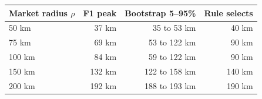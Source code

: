 \begin{tabular}{lrrr}
\toprule
Market radius $\rho$ & F1 peak & Bootstrap 5--95\% & Rule selects \\
\midrule
50 km & 37 km & 35 to 53 km & 40 km \\
75 km & 69 km & 53 to 122 km & 90 km \\
100 km & 84 km & 59 to 122 km & 90 km \\
150 km & 132 km & 122 to 158 km & 140 km \\
200 km & 192 km & 188 to 193 km & 190 km \\
\bottomrule
\end{tabular}
